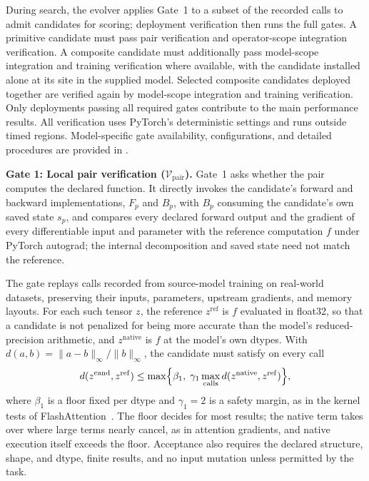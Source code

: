 During search, the evolver applies Gate~1 to a subset of the recorded calls to admit candidates for scoring; deployment verification then runs the full gates. A primitive candidate must pass pair verification and operator-scope integration verification. A composite candidate must additionally pass model-scope integration and training verification where available, with the candidate installed alone at its site in the supplied model. Selected composite candidates deployed together are verified again by model-scope integration and training verification. Only deployments passing all required gates contribute to the main performance results. All verification uses PyTorch's deterministic settings and runs outside timed regions. Model-specific gate availability, configurations, and detailed procedures are provided in .

\noindent\textbf{Gate 1: Local pair verification ($\mathcal{V}_{\mathrm{pair}}$).}
Gate~1 asks whether the pair computes the declared function. It directly invokes the candidate's forward and backward implementations, $F_p$ and $B_p$, with $B_p$ consuming the candidate's own saved state $s_p$, and compares every declared forward output and the gradient of every differentiable input and parameter with the reference computation $f$ under PyTorch autograd; the internal decomposition and saved state need not match the reference.

The gate replays calls recorded from source-model training on real-world datasets, preserving their inputs, parameters, upstream gradients, and memory layouts. For each such tensor $z$, the reference $z^{\mathrm{ref}}$ is $f$ evaluated in float32, so that a candidate is not penalized for being more accurate than the model's reduced-precision arithmetic, and $z^{\mathrm{native}}$ is $f$ at the model's own dtypes. With $d(a,b)=\|a-b\|_\infty/\|b\|_\infty$, the candidate must satisfy on every call
\begin{equation}
d(z^{\mathrm{cand}},z^{\mathrm{ref}})
\leq \max\Bigl\{\beta_1,\;\gamma_1\max_{\mathrm{calls}}d(z^{\mathrm{native}},z^{\mathrm{ref}})\Bigr\},
\label{eq:local_numerical_contract}
\end{equation}
where $\beta_1$ is a floor fixed per dtype and $\gamma_1=2$ is a safety margin, as in the kernel tests of FlashAttention~\cite{dao2022flashattention}. The floor decides for most results; the native term takes over where large terms nearly cancel, as in attention gradients, and native execution itself exceeds the floor. Acceptance also requires the declared structure, shape, and dtype, finite results, and no input mutation unless permitted by the task.



